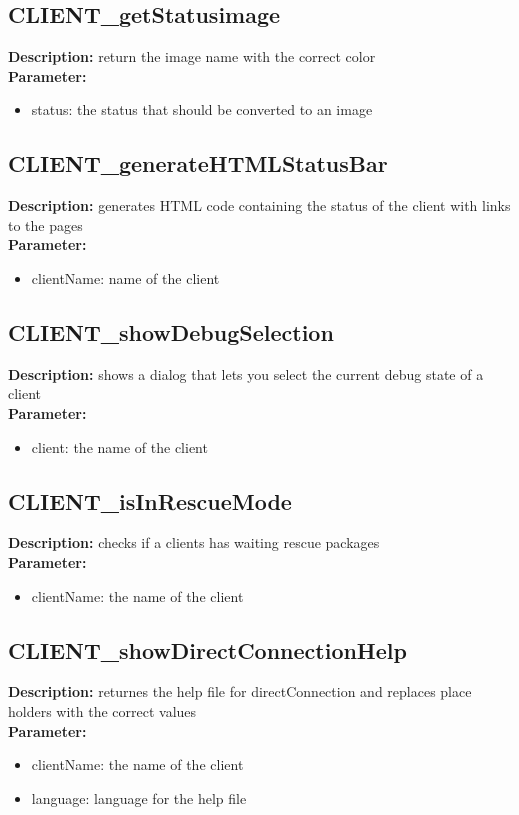 \subsection{CLIENT\_getStatusimage}
\textbf{Description:} return the image name with the correct color\\
\textbf{Parameter:}
\begin{itemize}
\item status: the status that should be converted to an image
\end{itemize}

\subsection{CLIENT\_generateHTMLStatusBar}
\textbf{Description:} generates HTML code containing the status of the client with links to the pages\\
\textbf{Parameter:}
\begin{itemize}
\item clientName: name of the client
\end{itemize}

\subsection{CLIENT\_showDebugSelection}
\textbf{Description:} shows a dialog that lets you select the current debug state of a client\\
\textbf{Parameter:}
\begin{itemize}
\item client: the name of the client
\end{itemize}

\subsection{CLIENT\_isInRescueMode}
\textbf{Description:} checks if a clients has waiting rescue packages\\
\textbf{Parameter:}
\begin{itemize}
\item clientName: the name of the client
\end{itemize}

\subsection{CLIENT\_showDirectConnectionHelp}
\textbf{Description:} returnes the help file for directConnection and replaces place holders with the correct values\\
\textbf{Parameter:}
\begin{itemize}
\item clientName: the name of the client
\item language: language for the help file
\end{itemize}

